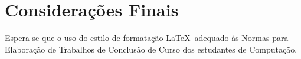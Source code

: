 \chapter{Considerações Finais}
Espera-se que o uso do estilo de formata\c{c}\~ao \LaTeX\ adequado \`as Normas para Elabora\c{c}\~ao de Trabalhos de Conclusão de Curso dos estudantes de Computação.
